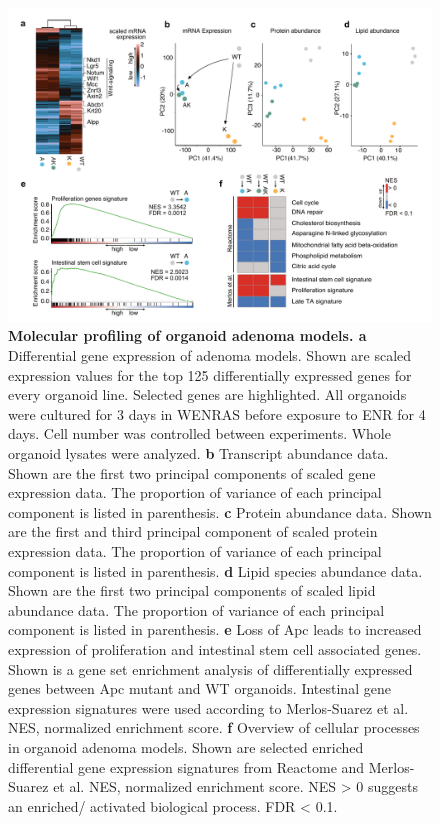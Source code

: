 \begin{flushleft}
\begin{figure}[H]
\centering
\includegraphics[width=\textwidth,
                height=\textheight,
                keepaspectratio]{figures/adenomaprofiling/pdf/fig_1_6_1.pdf}
\caption{\textbf{Molecular profiling of organoid adenoma models. a} Differential gene expression of adenoma models. Shown are scaled expression values for the top 125 differentially expressed genes for every organoid line. Selected genes are highlighted. All organoids were cultured for 3 days in WENRAS before exposure to ENR for 4 days. Cell number was controlled between experiments. Whole organoid lysates were analyzed. 
\textbf{b} Transcript abundance data. Shown are the first two principal components of scaled gene expression data. The proportion of variance of each principal component is listed in parenthesis. 
\textbf{c} Protein abundance data. Shown are the first and third principal component of scaled protein expression data. The proportion of variance of each principal component is listed in parenthesis. 
\textbf{d} Lipid species abundance data. Shown are the first two principal components of scaled lipid abundance data. The proportion of variance of each principal component is listed in parenthesis. 
\textbf{e} Loss of Apc leads to increased expression of proliferation and intestinal stem cell associated genes. Shown is a gene set enrichment analysis of differentially expressed genes between Apc mutant and WT organoids. Intestinal gene expression signatures were used according to Merlos-Suarez et al. NES, normalized enrichment score. 
\textbf{f} Overview of cellular processes in organoid adenoma models. Shown are selected enriched differential gene expression signatures from Reactome and Merlos-Suarez et al. NES, normalized enrichment score. NES > 0 suggests an enriched/ activated biological process. FDR < 0.1.}
\label{fig_161}
\end{figure}
\bigbreak


\end{flushleft}
